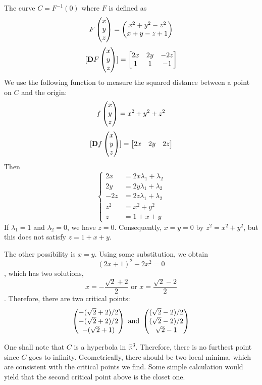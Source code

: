 \documentclass{homework}
\begin{document}
\begin{problem}{6}
The curve $C = F^{-1}(0)$ where $F$ is defined as
$$F\begin{pmatrix}x\\y\\z\end{pmatrix} = \begin{pmatrix}x^2+y^2-z^2\\x+y-z+1\end{pmatrix}$$
$$[\mathbf{D}F\begin{pmatrix}x\\y\\z\end{pmatrix}] = \begin{bmatrix}2x&2y&-2z\\1&1&-1\end{bmatrix}$$
We use the following function to measure the squared distance between a point
on $C$ and the origin:
$$f\begin{pmatrix}x\\y\\z\end{pmatrix} = x^2+y^2+z^2$$
$$[\mathbf{D}f\begin{pmatrix}x\\y\\z\end{pmatrix}] = \begin{bmatrix}2x&2y&2z\end{bmatrix}$$
Then
$$\left\{
\begin{aligned}
2x &= 2x\lambda_1 + \lambda_2 \\
2y &= 2y\lambda_1 + \lambda_2 \\
-2z &= 2z\lambda_1 + \lambda_2 \\
z^2 &= x^2 + y^2 \\
z &= 1 + x + y
\end{aligned}
\right.$$
If $\lambda_1 = 1$ and $\lambda_2 = 0$, we have $z = 0$. Consequently,
$x = y = 0$ by $z^2 = x^2 + y^2$, but this does not satisfy $z = 1 + x + y$.

The other possibility is $x = y$. Using some substitution, we obtain
$$(2x+1)^2 - 2x^2 = 0$$
, which has two solutions,
$$x = -\frac{\sqrt{2} + 2}{2} \text{ or } x = \frac{\sqrt{2} - 2}{2}$$
. Therefore, there are two critical points:
$$\begin{pmatrix}-(\sqrt{2} + 2)/2\\-(\sqrt{2} + 2)/2\\-(\sqrt{2} + 1)\end{pmatrix} \text{ and }
\begin{pmatrix}(\sqrt{2}-2)/2\\(\sqrt{2}-2)/2\\\sqrt{2}-1\end{pmatrix}$$

One shall note that $C$ is a hyperbola in $\mathbb{R}^3$. Therefore, there is
no furthest point since $C$ goes to infinity. Geometrically, there should be
two local minima, which are consistent with the critical points we find. Some
simple calculation would yield that the second critical point above is the
closet one.
\end{problem}
\end{document}
